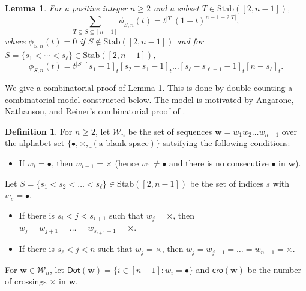 \documentclass[reqno]{amsart}
\newcommand{\Stab}{{\mathrm{Stab}}}
\newcommand{\cro}{{\mathsf{cro}}}
\renewcommand{\Dot}{{\mathsf{Dot}}}
\newtheorem{lem}[thm]{Lemma}
\theoremstyle{definition}
\newtheorem{defi}[thm]{Definition}
\theoremstyle{remark}
\begin{document}
\begin{lem} \label{lem:ChowIdentity}
For a positive integer $n\ge 2$ and a subset $T\in\Stab([2,n-1])$, 
\begin{equation} \label{eq:ChowIdentity}
    \sum_{T\subseteq S\subseteq [n-1]}\phi_{S,n}(t)=t^{|T|}(1+t)^{n-1-2|T|},
\end{equation}
where $\phi_{S,n}(t)=0$ if $S\notin\Stab([2,n-1])$ and for $S=\{s_1<\cdots<s_\ell\}\in\Stab([2,n-1])$,
\[
    \phi_{S,n}(t)=t^{|S|}[s_1-1]_t[s_2-s_1-1]_t\ldots[s_\ell-s_{\ell-1}-1]_t[n-s_\ell]_t.
\]
\end{lem}


We give a combinatorial proof of Lemma \ref{lem:ChowIdentity}. 
This is done by double-counting a combinatorial model constructed below. 
The model is motivated by Angarone, Nathanson, and Reiner's combinatorial proof of \cite[Theorem 1.1]{ANR2023PermRepchow}.

\begin{defi} \label{def:ChowModel}
For $n\ge 2$, let $\mathcal{W}_n$ be the set of  sequences $\mathbf{w}=w_1 w_2\ldots w_{n-1}$ over the alphabet set $\{\bullet, \times, \underline{\phantom{~}} (\text{a blank space})\}$ satsifying the following conditions:
\begin{itemize}
    \item[(W1)] If $w_i=\bullet$, then $w_{i-1}=\times$ (hence $w_1\neq\bullet$ and there is no consecutive $\bullet$ in $\mathbf{w}$).
\end{itemize}
Let $S=\{s_1<s_2<\ldots<s_\ell\}\in \Stab([2,n-1])$ be the set of indices $s$ with $w_s=\bullet$.
\begin{itemize}
    \item[(W2)] If there is $s_i<j<s_{i+1}$ such that $w_j=\times$, then $w_j=w_{j+1}=\ldots=w_{s_{i+1}-1}=\times$.
    \item[(W3)] If there is $s_{\ell}<j<n$ such that $w_j=\times$, then $w_j=w_{j+1}=\ldots=w_{n-1}=\times$.
\end{itemize}
For $\mathbf{w}\in\mathcal{W}_n$, let $\Dot(\mathbf{w})=\{i\in [n-1]: w_i=\bullet\}$ and $\cro(\mathbf{w})$ be the number of crossings $\times$ in $\mathbf{w}$.
\end{defi}
\end{document}
